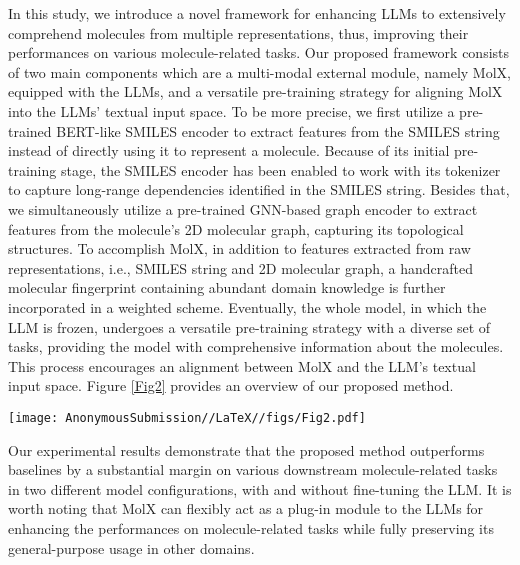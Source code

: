 In this study, we introduce a novel framework for enhancing LLMs to extensively comprehend molecules from multiple representations, thus, improving their performances on various molecule-related tasks. Our proposed framework consists of two main components which are a multi-modal external module, namely MolX, equipped with the LLMs, and a versatile pre-training strategy for aligning MolX into the LLMs’ textual input space. To be more precise, we first utilize a pre-trained BERT-like \cite{devlin2019bert} SMILES encoder to extract features from the SMILES string instead of directly using it to represent a molecule. Because of its initial pre-training stage, the SMILES encoder has been enabled to work with its tokenizer to capture long-range dependencies identified in the SMILES string. Besides that, we simultaneously utilize a pre-trained GNN-based graph encoder to extract features from the molecule’s 2D molecular graph, capturing its topological structures. To accomplish MolX, in addition to features extracted from raw representations, i.e., SMILES string and 2D molecular graph, a handcrafted molecular fingerprint \cite{morgan1965generation} containing abundant domain knowledge is further incorporated in a weighted scheme. Eventually, the whole model, in which the LLM is frozen, undergoes a versatile pre-training strategy with a diverse set of tasks, providing the model with comprehensive information about the molecules. This process encourages an alignment between MolX and the LLM’s textual input space. Figure \ref{Fig2} provides an overview of our proposed method. 

\begin{figure*}[!ht]
    \centering
    \texttt{[image: AnonymousSubmission//LaTeX//figs/Fig2.pdf]}
    \caption{An overview of our proposed method with the main pre-training task.}
    \label{Fig2}
\end{figure*}

Our experimental results demonstrate that the proposed method outperforms baselines by a substantial margin on various downstream molecule-related tasks in two different model configurations, with and without fine-tuning the LLM. It is worth noting that MolX can flexibly act as a plug-in module to the LLMs for enhancing the performances on molecule-related tasks while fully preserving its general-purpose usage in other domains. 

